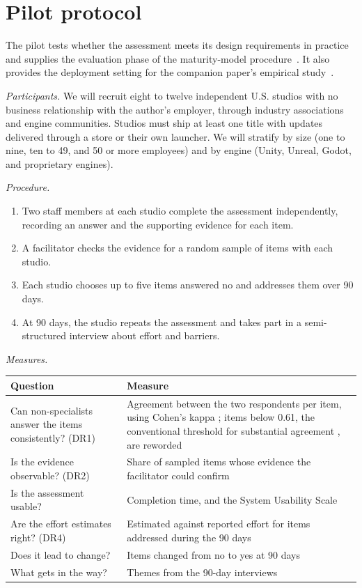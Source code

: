 \documentclass[acmsmall,screen,review]{acmart}
\begin{document}
\section{Pilot protocol}\label{sec:8}

The pilot tests whether the assessment meets its design requirements in practice and supplies the evaluation phase of the maturity-model procedure~\cite{becker2009developing}. It also provides the deployment setting for the companion paper's empirical study~\cite{keluoudeke2026untrusted}.

\emph{Participants.} We will recruit eight to twelve independent U.S. studios with no business relationship with the author's employer, through industry associations and engine communities. Studios must ship at least one title with updates delivered through a store or their own launcher. We will stratify by size (one to nine, ten to 49, and 50 or more employees) and by engine (Unity, Unreal, Godot, and proprietary engines).

\emph{Procedure.}

\begin{enumerate}
\item Two staff members at each studio complete the assessment independently, recording an answer and the supporting evidence for each item.
\item A facilitator checks the evidence for a random sample of items with each studio.
\item Each studio chooses up to five items answered no and addresses them over 90 days.
\item At 90 days, the studio repeats the assessment and takes part in a semi-structured interview about effort and barriers.
\end{enumerate}

\emph{Measures.}

\begin{center}
\small
\begin{tabularx}{\linewidth}{@{}>{\hsize=0.634\hsize\raggedright\arraybackslash}X>{\hsize=1.366\hsize\raggedright\arraybackslash}X@{}}
\toprule
\textbf{Question} & \textbf{Measure} \\
\midrule
Can non-specialists answer the items consistently? (DR1) & Agreement between the two respondents per item, using Cohen's kappa \cite{cohen1960coefficient}; items below 0.61, the conventional threshold for substantial agreement \cite{landis1977measurement}, are reworded \\
Is the evidence observable? (DR2) & Share of sampled items whose evidence the facilitator could confirm \\
Is the assessment usable? & Completion time, and the System Usability Scale \cite{brooke1996sus} \\
Are the effort estimates right? (DR4) & Estimated against reported effort for items addressed during the 90 days \\
Does it lead to change? & Items changed from no to yes at 90 days \\
What gets in the way? & Themes from the 90-day interviews \\
\bottomrule
\end{tabularx}
\end{center}
\end{document}
